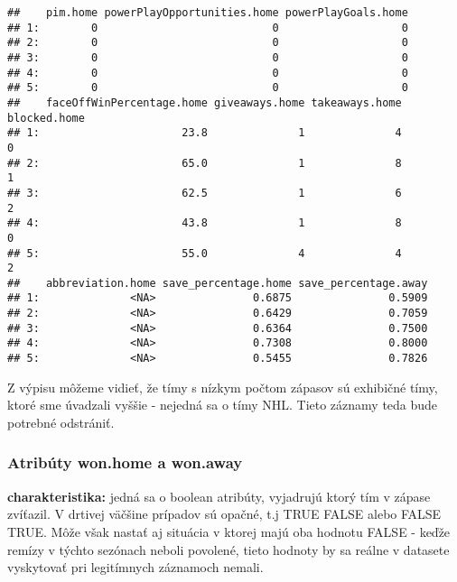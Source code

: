 \documentclass[
]{article}
\newenvironment{Shaded}{\begin{snugshade}}{\end{snugshade}}
\newcommand{\FunctionTok}[1]{\textcolor[rgb]{0.00,0.00,0.00}{#1}}
\newcommand{\NormalTok}[1]{#1}
\newcommand{\SpecialCharTok}[1]{\textcolor[rgb]{0.00,0.00,0.00}{#1}}
\begin{document}
\begin{verbatim}
##    pim.home powerPlayOpportunities.home powerPlayGoals.home
## 1:        0                           0                   0
## 2:        0                           0                   0
## 3:        0                           0                   0
## 4:        0                           0                   0
## 5:        0                           0                   0
##    faceOffWinPercentage.home giveaways.home takeaways.home blocked.home
## 1:                      23.8              1              4            0
## 2:                      65.0              1              8            1
## 3:                      62.5              1              6            2
## 4:                      43.8              1              8            0
## 5:                      55.0              4              4            2
##    abbreviation.home save_percentage.home save_percentage.away
## 1:              <NA>               0.6875               0.5909
## 2:              <NA>               0.6429               0.7059
## 3:              <NA>               0.6364               0.7500
## 4:              <NA>               0.7308               0.8000
## 5:              <NA>               0.5455               0.7826
\end{verbatim}

Z výpisu môžeme vidieť, že tímy s nízkym počtom zápasov sú exhibičné
tímy, ktoré sme úvadzali vyššie - nejedná sa o tímy NHL. Tieto záznamy
teda bude potrebné odstrániť.

\hypertarget{atribuxfaty-won.home-a-won.away}{%
\subsubsection{Atribúty won.home a
won.away}\label{atribuxfaty-won.home-a-won.away}}

\textbf{charakteristika:} jedná sa o boolean atribúty, vyjadrujú ktorý
tím v zápase zvíťazil. V drtivej väčšine prípadov sú opačné, t.j TRUE
FALSE alebo FALSE TRUE. Môže však nastať aj situácia v ktorej majú oba
hodnotu FALSE - keďže remízy v týchto sezónach neboli povolené, tieto
hodnoty by sa reálne v datasete vyskytovať pri legitímnych záznamoch
nemali.

\begin{Shaded}
\end{Shaded}
\end{document}
